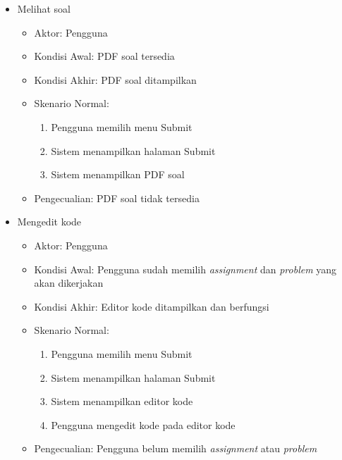 \begin{itemize}
    \item Melihat soal
        \begin{itemize}
            \item Aktor: Pengguna
            \item Kondisi Awal: PDF soal tersedia
            \item Kondisi Akhir: PDF soal ditampilkan
            \item Skenario Normal:
                \begin{enumerate}
                    \item Pengguna memilih menu Submit
                    \item Sistem menampilkan halaman Submit
                    \item Sistem menampilkan PDF soal
                \end{enumerate}
            \item Pengecualian: PDF soal tidak tersedia
        \end{itemize}
        
    \item Mengedit kode
        \begin{itemize}
            \item Aktor: Pengguna
            \item Kondisi Awal: Pengguna sudah memilih \textit{assignment} dan \textit{problem} yang akan dikerjakan
            \item Kondisi Akhir: Editor kode ditampilkan dan berfungsi
            \item Skenario Normal:
                \begin{enumerate}
                    \item Pengguna memilih menu Submit
                    \item Sistem menampilkan halaman Submit
                    \item Sistem menampilkan editor kode
                    \item Pengguna mengedit kode pada editor kode
                \end{enumerate}
            \item Pengecualian: Pengguna belum memilih \textit{assignment} atau \textit{problem}
        \end{itemize}
        

\end{itemize}
